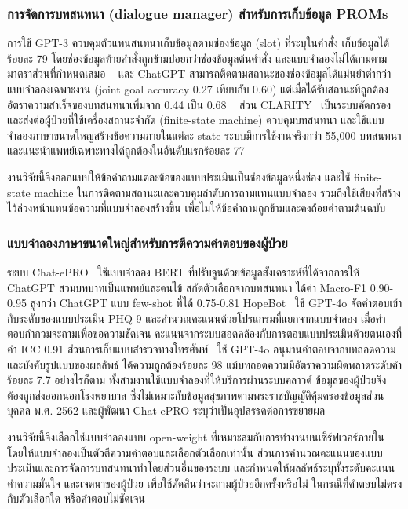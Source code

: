 \subsubsection{การจัดการบทสนทนา (dialogue manager) สำหรับการเก็บข้อมูล PROMs}
\label{sec:review-dialogue}

การใช้ GPT-3 ควบคุมตัวแทนสนทนาเก็บข้อมูลตามช่องข้อมูล (slot) ที่ระบุในคำสั่ง
เก็บข้อมูลได้ร้อยละ 79 โดยช่องข้อมูลท้ายคำสั่งถูกข้ามบ่อยกว่าช่องข้อมูลต้นคำสั่ง และแบบจำลองไม่ได้ถามตามมาตราส่วนที่กำหนดเสมอ ~\citep{Wei2024}
และ ChatGPT สามารถติดตามสถานะของช่องข้อมูลได้แม่นยำต่ำกว่าแบบจำลองเฉพาะงาน (joint goal accuracy 0.27 เทียบกับ 0.60) แต่เมื่อได้รับสถานะที่ถูกต้อง อัตราความสำเร็จของบทสนทนาเพิ่มจาก 0.44 เป็น 0.68 ~\citep{Hudecek2023}
ส่วน CLARITY~\citep{Shaposhnikov2025} เป็นระบบคัดกรองและส่งต่อผู้ป่วยที่ใช้เครื่องสถานะจำกัด (finite-state machine) ควบคุมบทสนทนา
และใช้แบบจำลองภาษาขนาดใหญ่สร้างข้อความภายในแต่ละ state ระบบมีการใช้งานจริงกว่า 55,000 บทสนทนา และแนะนำแพทย์เฉพาะทางได้ถูกต้องในอันดับแรกร้อยละ 77

งานวิจัยนี้จึงออกแบบให้ข้อคำถามแต่ละข้อของแบบประเมินเป็นช่องข้อมูลหนึ่งช่อง และใช้ finite-state machine ในการติดตามสถานะและควบคุมลำดับการถามแทนแบบจำลอง
รวมถึงใช้เสียงที่สร้างไว้ล่วงหน้าแทนข้อความที่แบบจำลองสร้างขึ้น เพื่อไม่ให้ข้อคำถามถูกข้ามและคงถ้อยคำตามต้นฉบับ \citep{Coons2009}

\subsubsection{แบบจำลองภาษาขนาดใหญ่สำหรับการตีความคำตอบของผู้ป่วย}
\label{sec:review-interpret}

ระบบ Chat-ePRO~\citep{Chen2024} ใช้แบบจำลอง BERT ที่ปรับจูนด้วยข้อมูลสังเคราะห์ที่ได้จากการให้ ChatGPT สวมบทบาทเป็นแพทย์และคนไข้ 
สกัดตัวเลือกจากบทสนทนา ได้ค่า Macro-F1 0.90-0.95 สูงกว่า ChatGPT แบบ few-shot ที่ได้ 0.75-0.81
HopeBot~\citep{Guo2025} ใช้ GPT-4o จัดคำตอบเข้ากับระดับของแบบประเมิน PHQ-9 และคำนวณคะแนนด้วยโปรแกรมที่แยกจากแบบจำลอง
เมื่อคำตอบกำกวมจะถามเพื่อขอความชัดเจน คะแนนจากระบบสอดคล้องกับการตอบแบบประเมินด้วยตนเองที่ค่า ICC 0.91
ส่วนการเก็บแบบสำรวจทางโทรศัพท์~\citep{Kaiyrbekov2025} ใช้ GPT-4o อนุมานคำตอบจากบทถอดความและบังคับรูปแบบของผลลัพธ์
ได้ความถูกต้องร้อยละ 98 แม้บทถอดความมีอัตราความผิดพลาดระดับคำร้อยละ 7.7
อย่างไรก็ตาม ทั้งสามงานใช้แบบจำลองที่ให้บริการผ่านระบบคลาวด์ ข้อมูลของผู้ป่วยจึงต้องถูกส่งออกนอกโรงพยาบาล
ซึ่งไม่เหมาะกับข้อมูลสุขภาพตามพระราชบัญญัติคุ้มครองข้อมูลส่วนบุคคล พ.ศ. 2562 และผู้พัฒนา Chat-ePRO ระบุว่าเป็นอุปสรรคต่อการขยายผล~\citep{Chen2024}

งานวิจัยนี้จึงเลือกใช้แบบจำลองแบบ open-weight ที่เหมาะสมกับการทำงานบนเซิร์ฟเวอร์ภายใน โดยให้แบบจำลองเป็นตัวตีความคำตอบและเลือกตัวเลือกเท่านั้น 
ส่วนการคำนวณคะแนนของแบบประเมินและการจัดการบทสนทนาทำโดยส่วนอื่นของระบบ
และกำหนดให้ผลลัพธ์ระบุทั้งระดับคะแนน ค่าความมั่นใจ และเจตนาของผู้ป่วย เพื่อใช้ตัดสินว่าจะถามผู้ป่วยอีกครั้งหรือไม่
ในกรณีที่คำตอบไม่ตรงกับตัวเลือกใด หรือคำตอบไม่ชัดเจน